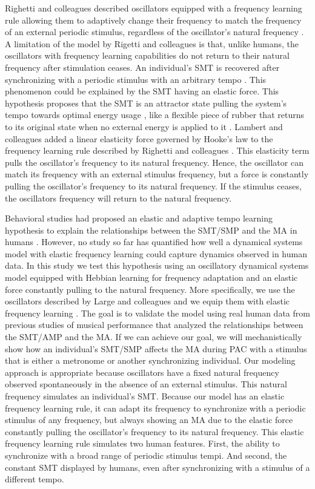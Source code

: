 \documentclass{report}
\begin{document}
Righetti and colleagues described oscillators equipped with a frequency learning rule allowing them to adaptively change their frequency to match the frequency of an external periodic stimulus, regardless of the oscillator's natural frequency \cite{righetti2009adaptive}. A limitation of the model by Rigetti and colleagues is that, unlike humans, the oscillators with frequency learning capabilities do not return to their natural frequency after stimulation ceases. An individual's SMT is recovered after synchronizing with a periodic stimulus with an arbitrary tempo \cite{scheurich2018tapping}. This phenomenon could be explained by the SMT having an elastic force. This hypothesis proposes that the SMT is an attractor state pulling the system's tempo towards optimal energy usage \cite{mcauley2006time, scheurich2018tapping}, like a flexible piece of rubber that returns to its original state when no external energy is applied to it \cite{strogatz1993coupled}. Lambert and colleagues added a linear elasticity force governed by Hooke's law to the frequency learning rule described by Righetti and colleagues \cite{lambert2016adaptive}. This elasticity term pulls the oscillator's frequency to its natural frequency. Hence, the oscillator can match its frequency with an external stimulus frequency, but a force is constantly pulling the oscillator's frequency to its natural frequency. If the stimulus ceases, the oscillators frequency will return to the natural frequency.

Behavioral studies had proposed an elastic and adaptive tempo learning hypothesis to explain the relationships between the SMT/SMP and the MA in humans \cite{scheurich2018tapping}. However, no study so far has quantified how well a dynamical systems model with elastic frequency learning could capture dynamics observed in human data. In this study we test this hypothesis using an oscillatory dynamical systems model equipped with Hebbian learning for frequency adaptation and an elastic force constantly pulling to the natural frequency. More specifically, we use the oscillators described by Large and colleagues \cite{large2010canonical} and we equip them with elastic frequency learning \cite{righetti2009adaptive, lambert2016adaptive}. The goal is to validate the model using real human data from previous studies of musical performance that analyzed the relationships between the SMT/AMP and the MA. If we can achieve our goal, we will mechanistically show how an individual's SMT/SMP affects the MA during PAC with a stimulus that is either a metronome or another synchronizing individual. Our modeling approach is appropriate because oscillators have a fixed natural frequency observed spontaneously in the absence of an external stimulus. This natural frequency simulates an individual's SMT. Because our model has an elastic frequency learning rule, it can adapt its frequency to synchronize with a periodic stimulus of any frequency, but always showing an MA due to the elastic force constantly pulling the oscillator's frequency to its natural frequency. This elastic frequency learning rule simulates two human features. First, the ability to synchronize with a broad range of periodic stimulus tempi. And second, the constant SMT displayed by humans, even after synchronizing with a stimulus of a different tempo. 
\end{document}
